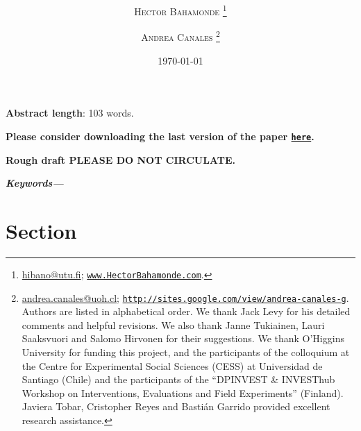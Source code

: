 \documentclass[onesided]{article}\usepackage[]{graphicx}\usepackage[]{color}
\title{\vspace{-15mm}\fontsize{18pt}{7pt}\selectfont\textbf{\unskip}} %
\author[1]{

\textsc{Hector Bahamonde}
\thanks{\href{mailto:hibano@utu.fi}{hibano@utu.fi}; \href{http://www.hectorbahamonde.com}{\texttt{www.HectorBahamonde.com}}.}}
\author[2]{

\textsc{Andrea Canales}
\thanks{\href{mailto:andrea.canales@uoh.cl}{andrea.canales@uoh.cl}; 
\href{http://sites.google.com/view/andrea-canales-g}{\texttt{http://sites.google.com/view/andrea-canales-g}}. \\
Authors are listed in alphabetical order. We thank Jack Levy for his detailed comments and helpful revisions. We also thank Janne Tukiainen, Lauri Saaksvuori and Salomo Hirvonen for their suggestions. We thank O'Higgins University for funding this project, and the participants of the colloquium at the Centre for Experimental Social Sciences (CESS) at Universidad de Santiago (Chile) and the participants of the ``DPINVEST \& INVESThub Workshop on Interventions, Evaluations and Field Experiments'' (Finland). Javiera Tobar, Cristopher Reyes and Basti\'an Garrido provided excellent research assistance.}}
\affil[1]{Senior Researcher, University of Turku, Finland}
\affil[2]{Assistant Professor, O$'$Higgins University, Chile}
\date{\today}
\begin{document}


\setcounter{hyp}{0} %

\maketitle %



















\newpage
\begin{abstract}
\unskip
\end{abstract}


\vspace*{0.3cm}
\centerline{{\bf Abstract length}: 103 words.}
\vspace*{0.3cm}



\centerline{\bf Please consider downloading the last version of the paper \href{https://github.com/hbahamonde/Exp_Vote_Selling/raw/master/Vote_Selling_Bahamonde_Canales_Paper_2.pdf}{\texttt{{\color{red}here}}}.}

\vspace*{0.3cm}
\centerline{\bf {\color{red}Rough draft PLEASE DO NOT CIRCULATE}.}


\centerline{\providecommand{\keywords}[1]{\textbf{\textit{Keywords---}} #1} %
\keywords{{\unskip}}}



\clearpage
\newpage
{}
\setcounter{page}{1}

\newpage

\section{Section}
\end{document}
